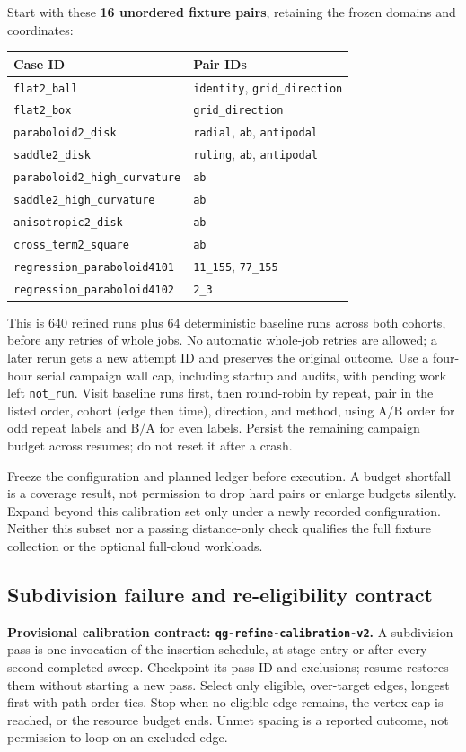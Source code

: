 \documentclass[11pt,letterpaper]{article}
\newcommand{\src}[1]{\nolinkurl{#1}}
\begin{document}
Start with these \textbf{16 unordered fixture pairs}, retaining the frozen domains and coordinates:
\begin{center}\small
\begin{tabular}{@{}ll@{}}
\toprule
Case ID & Pair IDs\\
\midrule
\src{flat2_ball} & \src{identity}, \src{grid_direction}\\
\src{flat2_box} & \src{grid_direction}\\
\src{paraboloid2_disk} & \src{radial}, \src{ab}, \src{antipodal}\\
\src{saddle2_disk} & \src{ruling}, \src{ab}, \src{antipodal}\\
\src{paraboloid2_high_curvature} & \src{ab}\\
\src{saddle2_high_curvature} & \src{ab}\\
\src{anisotropic2_disk} & \src{ab}\\
\src{cross_term2_square} & \src{ab}\\
\src{regression_paraboloid4101} & \src{11_155}, \src{77_155}\\
\src{regression_paraboloid4102} & \src{2_3}\\
\bottomrule
\end{tabular}
\end{center}
This is 640 refined runs plus 64 deterministic baseline runs across both cohorts, before any retries of whole jobs. No automatic whole-job retries are allowed; a later rerun gets a new attempt ID and preserves the original outcome. Use a four-hour serial campaign wall cap, including startup and audits, with pending work left \src{not_run}. Visit baseline runs first, then round-robin by repeat, pair in the listed order, cohort (edge then time), direction, and method, using A/B order for odd repeat labels and B/A for even labels. Persist the remaining campaign budget across resumes; do not reset it after a crash.

Freeze the configuration and planned ledger before execution. A budget shortfall is a coverage result, not permission to drop hard pairs or enlarge budgets silently. Expand beyond this calibration set only under a newly recorded configuration. Neither this subset nor a passing distance-only check qualifies the full fixture collection or the optional full-cloud workloads.

\subsection{Subdivision failure and re-eligibility contract}\label{sec:subdivision-contract}
\textbf{Provisional calibration contract: \src{qg-refine-calibration-v2}.} A subdivision pass is one invocation of the insertion schedule, at stage entry or after every second completed sweep. Checkpoint its pass ID and exclusions; resume restores them without starting a new pass. Select only eligible, over-target edges, longest first with path-order ties. Stop when no eligible edge remains, the vertex cap is reached, or the resource budget ends. Unmet spacing is a reported outcome, not permission to loop on an excluded edge.
\end{document}
